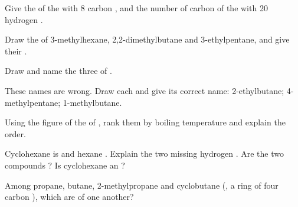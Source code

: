 \begin{exercise}[$\star$]\label{exo:g11:organic-skeletons:5}
Give the  of the  with 8 carbon , and the
number of carbon  of the  with 20 hydrogen .
\end{exercise}

\begin{exercise}[$\star\star$]\label{exo:g11:organic-skeletons:6}
Draw the  of 3-methylhexane, 2,2-dimethylbutane and
3-ethylpentane, and give their .
\end{exercise}

\begin{exercise}[$\star\star$]\label{exo:g11:organic-skeletons:7}
Draw and name the three  of .
\end{exercise}

\begin{exercise}[$\star\star$]\label{exo:g11:organic-skeletons:8}
These names are wrong. Draw each  and give its correct name:
2-ethylbutane; 4-methylpentane; 1-methylbutane.
\end{exercise}

\begin{exercise}[$\star\star$]\label{exo:g11:organic-skeletons:9}
Using the figure of the  of , rank them by boiling
temperature and explain the order.
\end{exercise}

\begin{exercise}[$\star\star$]\label{exo:g11:organic-skeletons:10}
Cyclohexane is  and hexane . Explain the two
missing hydrogen . Are the two compounds ? Is cyclohexane an
?
\end{exercise}

\begin{exercise}[$\star\star$]\label{exo:g11:organic-skeletons:11}
Among propane, butane, 2-methylpropane and cyclobutane (, a
ring of four carbon ), which are  of one another?
\end{exercise}

